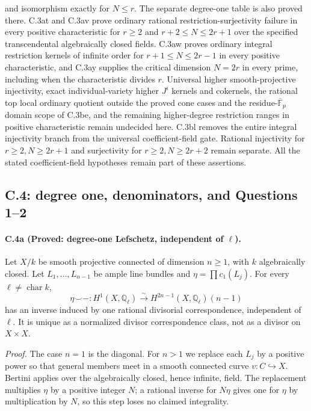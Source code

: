 and isomorphism exactly for $N\le r$. The separate
degree-one table is also proved there.
C.3at and C.3av prove ordinary rational restriction-surjectivity
failure in every positive characteristic for
$r\ge2$ and $r+2\le N\le2r+1$ over the specified
transcendental algebraically closed fields. C.3aw proves
ordinary integral restriction kernels of infinite order for
$r+1\le N\le2r-1$ in every positive characteristic, and
C.3ay supplies the critical dimension $N=2r$ in every prime,
including when the characteristic divides $r$.
Universal higher smooth-projective injectivity, exact
individual-variety higher $J^i$ kernels and cokernels,
the rational top local ordinary quotient outside the proved
cone cases and the residue-$\overline{\mathbb F}_p$ domain scope
of C.3be, and the remaining higher-degree restriction ranges
in positive characteristic remain undecided here. C.3bl removes
the entire integral injectivity branch from the universal
coefficient-field gate. Rational injectivity for $r\ge2,N\ge2r+1$
and surjectivity for
$r\ge2,N\ge2r+2$ remain separate. All the stated
coefficient-field hypotheses remain
part of these assertions.

\subsection{C.4: degree one, denominators, and Questions 1--2}

\paragraph{C.4a (Proved: degree-one Lefschetz, independent of $\ell$).}
Let $X/k$ be smooth projective connected of dimension $n\ge1$, with
$k$ algebraically closed. Let $L_1,\ldots,L_{n-1}$ be ample line bundles
and $\eta=\prod c_1(L_j)$. For every $\ell\ne\operatorname{char}k$,
\begin{equation}\label{eq:degree-one-lefschetz}
 \eta\smile-:H^1(X,\mathbb Q_\ell)\xrightarrow{\sim}
 H^{2n-1}(X,\mathbb Q_\ell)(n-1)
\end{equation}
has an inverse induced by one rational divisorial correspondence,
independent of $\ell$. It is unique as a normalized divisor
correspondence class, not as a divisor on $X\times X$.

\emph{Proof.}
The case $n=1$ is the diagonal. For $n>1$ we replace each $L_j$ by a
positive power so that general members meet in a smooth connected
curve $v:C\hookrightarrow X$. Bertini applies over the algebraically
closed, hence infinite, field. The replacement multiplies $\eta$ by
a positive integer $N$; a rational inverse for $N\eta$ gives one for
$\eta$ by multiplication by $N$, so this step loses no claimed
integrality.

